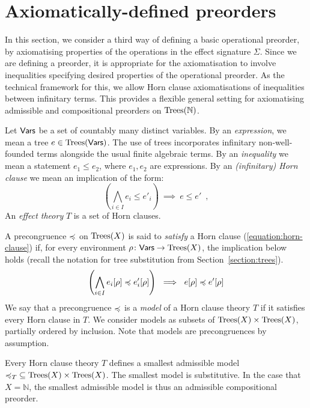 \section{Axiomatically-defined preorders}

In this section, we consider a third way of defining a basic operational preorder, by axiomatising
properties of the operations in the effect signature $\Sigma$.
Since we are defining a preorder, it is appropriate for the axiomatisation to involve inequalities
specifying desired properties of the operational preorder. As the technical framework for this, we allow
Horn clause axiomatisations of inequalities between infinitary terms.  This provides a flexible general setting for
axiomatising admissible and compositional preorders on 
$\textnormal{Trees}(\mathbb{N})$. 

Let $\mathsf{Vars}$ be a set of countably many distinct variables. By an  \emph{expression}, we mean a
tree $e \in \textnormal{Trees}(\mathsf{Vars})$. The use of trees incorporates infinitary non-well-founded terms alongside the usual finite
algebraic terms. By an \emph{inequality} we mean a statement $e_1 \leq e_2$, where $e_1, e_2$ are expressions.
By an \emph{(infinitary) Horn clause} we mean an implication of the form:
\begin{equation}
\label{equation:horn-clause}
\left( \bigwedge_{i \in I} e_i \leq e'_i \right)~ \implies ~ e \leq e' \enspace ,
\end{equation}
An \emph{effect theory} $T$  is a set of Horn clauses.

A precongruence $\preccurlyeq$ on $\textnormal{Trees}(X)$ is said to \emph{satisfy} a Horn clause (\ref{equation:horn-clause}) if,
for every environment $\rho \colon \mathsf{Vars} \to \textnormal{Trees}(X)$, the implication below holds (recall the notation for tree substitution from Section~\ref{section:trees}).
\[
\left( \bigwedge_{i \in I} e_i[\rho] \preccurlyeq e'_i[\rho] \right) ~ \implies ~  e[\rho] \preccurlyeq e'[\rho] 
\]
We say that a precongruence $\preccurlyeq$ is a \emph{model} of a Horn clause theory $T$ if it satisfies every Horn clause in $T$.
We consider models as subsets of $\textnormal{Trees}(X) \times \textnormal{Trees}(X)$, partially ordered by inclusion. Note that models are precongruences by assumption.
\begin{proposition}
Every Horn clause theory $T$ defines a smallest admissible model  ${\preccurlyeq_T} \subseteq \textnormal{Trees}(X) \times \textnormal{Trees}(X)$. The smallest model
is substitutive. In the case that $X = \mathbb{N}$, the smallest admissible model is thus an
admissible compositional preorder.
\end{proposition}


